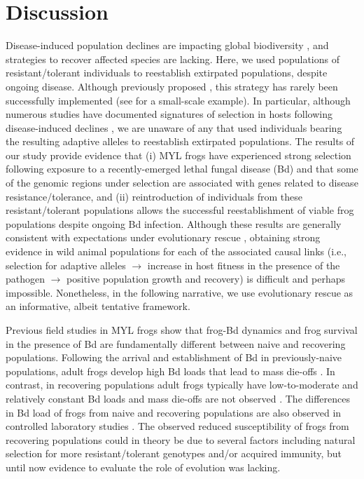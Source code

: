 \documentclass[9pt,twocolumn,twoside,lineno]{pnas-new}
\begin{document}
\section*{Discussion}

Disease-induced population declines are impacting global biodiversity
\citep{daszak2000}, and strategies to recover affected species are
lacking. Here, we used populations of resistant/tolerant individuals to
reestablish extirpated populations, despite ongoing disease. Although
previously proposed \citep{mendelson2019}, this strategy has rarely been
successfully implemented (see \citep{joseph2018} for a small-scale
example). In particular, although numerous studies have documented
signatures of selection in hosts following disease-induced declines
\citep[e.g.,][]{epstein2016, gignoux-wolfsohn2021}, we are unaware of
any that used individuals bearing the resulting adaptive alleles to
reestablish extirpated populations. The results of our study provide
evidence that (i) MYL frogs have experienced strong selection following
exposure to a recently-emerged lethal fungal disease (Bd) and that some
of the genomic regions under selection are associated with genes related
to disease resistance/tolerance, and (ii) reintroduction of individuals
from these resistant/tolerant populations allows the successful
reestablishment of viable frog populations despite ongoing Bd infection.
Although these results are generally consistent with expectations under
evolutionary rescue \citep{carlson2014}, obtaining strong evidence in
wild animal populations for each of the associated causal links (i.e.,
selection for adaptive alleles \(\rightarrow\) increase in host fitness
in the presence of the pathogen \(\rightarrow\) positive population
growth and recovery) is difficult and perhaps impossible. Nonetheless,
in the following narrative, we use evolutionary rescue as an
informative, albeit tentative framework.

Previous field studies in MYL frogs show that frog-Bd dynamics and frog
survival in the presence of Bd are fundamentally different between naive
and recovering populations. Following the arrival and establishment of
Bd in previously-naive populations, adult frogs develop high Bd loads
that lead to mass die-offs \citep{vredenburg2010}. In contrast, in
recovering populations adult frogs typically have low-to-moderate and
relatively constant Bd loads and mass die-offs are not observed
\citep[see also Figure S5 - before
translocation]{briggs2010, knapp2011}. The differences in Bd load of
frogs from naive and recovering populations are also observed in
controlled laboratory studies \citep[Figure 4]{knapp2016}. The observed
reduced susceptibility of frogs from recovering populations could in
theory be due to several factors including natural selection for more
resistant/tolerant genotypes and/or acquired immunity, but until now
evidence to evaluate the role of evolution was lacking.
\end{document}

